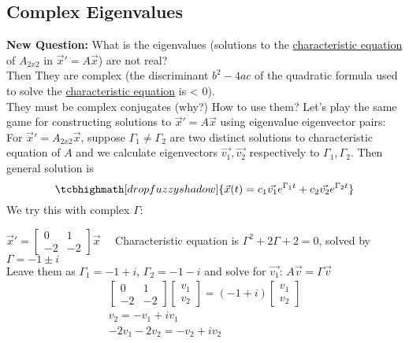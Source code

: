 \subsection*{Complex Eigenvalues}
\textbf{New Question:} What is the eigenvalues (solutions to the \underline{characteristic equation} of $A_{2x2}$ in $\vec{x}' = A\vec{x}$) are not real?\\
Then They are complex (the discriminant $b^2 - 4ac$ of the quadratic formula used to solve the \underline{characteristic equation} is < 0).\\
They must be complex conjugates (why?) How to use them?
Let's play the same game for constructing solutions to $\vec{x}' = A\vec{x}$ using eigenvalue eigenvector pairs:\\
For $\vec{x}' = A_{2x2} \vec{x}$, suppose $\Gamma_1 \neq \Gamma_2$ are two distinct solutions to characteristic equation of $A$ and we calculate eigenvectors $\vec{v_1}, \vec{v_2}$ respectively to $\Gamma_1, \Gamma_2$. Then general solution is
\begin{equation*}
	\tcbhighmath[drop fuzzy shadow]{\vec{x}(t) = c_1 \vec{v_1} e^{\Gamma_1 t} + c_2 \vec{v_2} e^{\Gamma_2 t}}
\end{equation*}
We try this with complex $\Gamma$:
\begin{example-N}
	$\vec{x}' = \begin{bmatrix}
		0 & 1\\
		-2 & -2
	\end{bmatrix} \vec{x} \quad$ Characteristic equation is $\Gamma^2 + 2\Gamma + 2 = 0$, solved by $\Gamma = -1 \pm i$\\
	Leave them as $\Gamma_1 = -1 + i$, $\Gamma_2 = -1-i$ and solve for $\vec{v_1}$: $A\vec{v} = \Gamma \vec{v}$
	\begin{gather*}
		\begin{bmatrix}
			0 & 1\\
			-2 & -2
		\end{bmatrix}
		\begin{bmatrix}
			v_1\\
			v_2
		\end{bmatrix} = (-1 + i)
		\begin{bmatrix}
			v_1\\
			v_2
		\end{bmatrix}\\
		v_2 = -v_1 + iv_1\\
		-2v_1 -2v_2 = -v_2 + iv_2
	\end{gather*}
\end{example-N}
